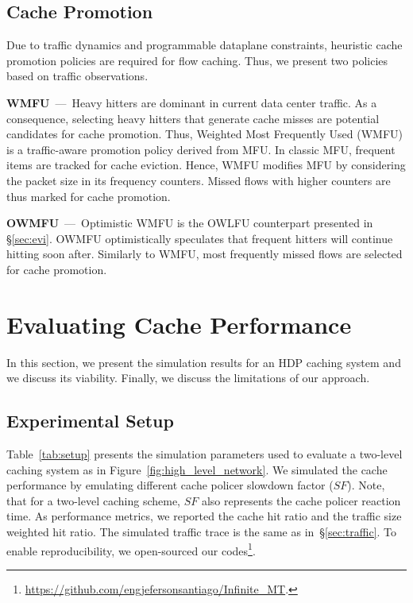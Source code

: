 \subsection{Cache Promotion}
Due to traffic dynamics and programmable dataplane constraints, heuristic cache promotion policies are required for flow caching.
Thus, we present two policies based on traffic observations.

\textbf{WMFU}~---~Heavy hitters are dominant in current data center traffic.
As a consequence, selecting heavy hitters that generate cache misses are potential candidates for cache promotion.
Thus, Weighted Most Frequently Used (WMFU) is a traffic-aware promotion policy derived from MFU.
In classic MFU, frequent items are tracked for cache eviction.
Hence, WMFU modifies MFU by considering the packet size in its frequency counters.
Missed flows with higher counters are thus marked for cache promotion.

\textbf{OWMFU}~---~Optimistic WMFU is the OWLFU counterpart presented in \S\ref{sec:evi}.
OWMFU optimistically speculates that frequent hitters will continue hitting soon after.
Similarly to WMFU, most frequently missed flows are selected for cache promotion.



\section{Evaluating Cache Performance}\label{sec:cache_results}
In this section, we present the simulation results for an HDP caching system and we discuss its viability.
Finally, we discuss the limitations of our approach.

\subsection{Experimental Setup}
Table~\ref{tab:setup} presents the simulation parameters used to evaluate a two-level caching system as in Figure~\ref{fig:high_level_network}.
We simulated the cache performance by emulating different cache policer slowdown factor ($SF$).
Note, that for a two-level caching scheme, $SF$ also represents the cache policer reaction time.
As performance metrics, we reported the cache hit ratio and the traffic size weighted hit ratio.
The simulated traffic trace is the same as in~\S\ref{sec:traffic}.
To enable reproducibility, we open-sourced our codes\footnote{\url{https://github.com/engjefersonsantiago/Infinite_MT}.}.


